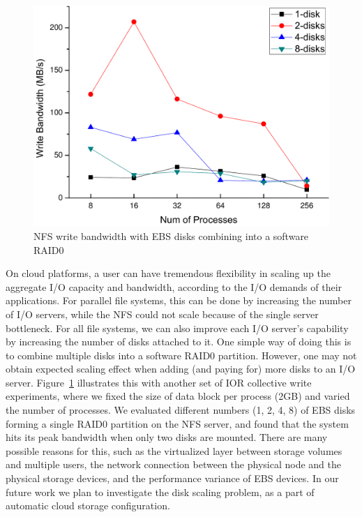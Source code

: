     \begin{figure}[htpb]
        \centering
        \includegraphics[width=0.8\linewidth]{../figures/nfs-raid0-write}
        \caption{NFS write bandwidth with EBS disks combining into a software RAID0}
        \label{fig:nfs_raid0}
    \end{figure}

    On cloud platforms, a user can have tremendous flexibility in scaling up
    the aggregate I/O capacity and bandwidth, according to the I/O demands of
    their applications. For parallel file systems, this can be done by
    increasing the number of I/O servers, while the NFS could not scale
    because of the single server bottleneck. For all file systems, we can also
    improve each I/O server's capability by increasing the number of disks
    attached to it. One simple way of doing this is to combine multiple disks
    into a software RAID0 partition.  However, one may not obtain expected
    scaling effect when adding (and paying for) more disks to an I/O server.
    Figure~\ref{fig:nfs_raid0} illustrates this with another set of IOR
    collective write experiments, where we fixed the size of data block per
    process (2GB) and varied the number of processes. We evaluated different
    numbers (1, 2, 4, 8) of EBS disks forming a single RAID0 partition on the
    NFS server, and found that the system  hits its peak bandwidth when only
    two disks are mounted. There are many possible reasons for this, such as
    the virtualized layer between storage volumes and multiple users, the
    network connection between the physical node and the physical storage
    devices, and the performance variance of EBS devices. In our future work
    we plan to investigate the disk scaling problem, as a part of automatic
    cloud storage configuration.

